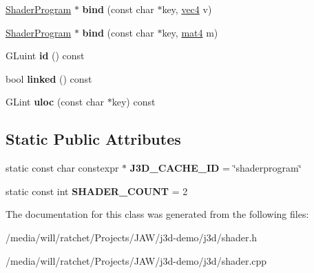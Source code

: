 \begin{DoxyCompactItemize}
\item 
\hypertarget{classj3d_1_1ShaderProgram_a5eddbfaadf6fd550a1a603b8f8662dfd}{}\hyperlink{classj3d_1_1ShaderProgram}{Shader\+Program} $\ast$ {\bfseries bind} (const char $\ast$key, \hyperlink{structj3d_1_1vec4}{vec4} v)\label{classj3d_1_1ShaderProgram_a5eddbfaadf6fd550a1a603b8f8662dfd}

\item 
\hypertarget{classj3d_1_1ShaderProgram_a16c12cb76e91a9ffd65d5fb15abcfe1c}{}\hyperlink{classj3d_1_1ShaderProgram}{Shader\+Program} $\ast$ {\bfseries bind} (const char $\ast$key, \hyperlink{structj3d_1_1mat4}{mat4} m)\label{classj3d_1_1ShaderProgram_a16c12cb76e91a9ffd65d5fb15abcfe1c}

\item 
\hypertarget{classj3d_1_1ShaderProgram_a29c32f30181b9d32c4ebcd2a1f8ac9d1}{}G\+Luint {\bfseries id} () const \label{classj3d_1_1ShaderProgram_a29c32f30181b9d32c4ebcd2a1f8ac9d1}

\item 
\hypertarget{classj3d_1_1ShaderProgram_a65c6128b795a9a67d49e471ee6f1abcf}{}bool {\bfseries linked} () const \label{classj3d_1_1ShaderProgram_a65c6128b795a9a67d49e471ee6f1abcf}

\item 
\hypertarget{classj3d_1_1ShaderProgram_a255692aee26f1c3f405e841d9999fa29}{}G\+Lint {\bfseries uloc} (const char $\ast$key) const \label{classj3d_1_1ShaderProgram_a255692aee26f1c3f405e841d9999fa29}

\end{DoxyCompactItemize}
\subsection*{Static Public Attributes}
\begin{DoxyCompactItemize}
\item 
\hypertarget{classj3d_1_1ShaderProgram_af54405ccdbe123c9b13c061726553ce1}{}static const char constexpr $\ast$ {\bfseries J3\+D\+\_\+\+C\+A\+C\+H\+E\+\_\+\+I\+D} = \char`\"{}shaderprogram\char`\"{}\label{classj3d_1_1ShaderProgram_af54405ccdbe123c9b13c061726553ce1}

\item 
\hypertarget{classj3d_1_1ShaderProgram_a2d04080fbe4a4acff8ebcdc046334f88}{}static const int {\bfseries S\+H\+A\+D\+E\+R\+\_\+\+C\+O\+U\+N\+T} = 2\label{classj3d_1_1ShaderProgram_a2d04080fbe4a4acff8ebcdc046334f88}

\end{DoxyCompactItemize}


The documentation for this class was generated from the following files\+:\begin{DoxyCompactItemize}
\item 
/media/will/ratchet/\+Projects/\+J\+A\+W/j3d-\/demo/j3d/shader.\+h\item 
/media/will/ratchet/\+Projects/\+J\+A\+W/j3d-\/demo/j3d/shader.\+cpp\end{DoxyCompactItemize}
